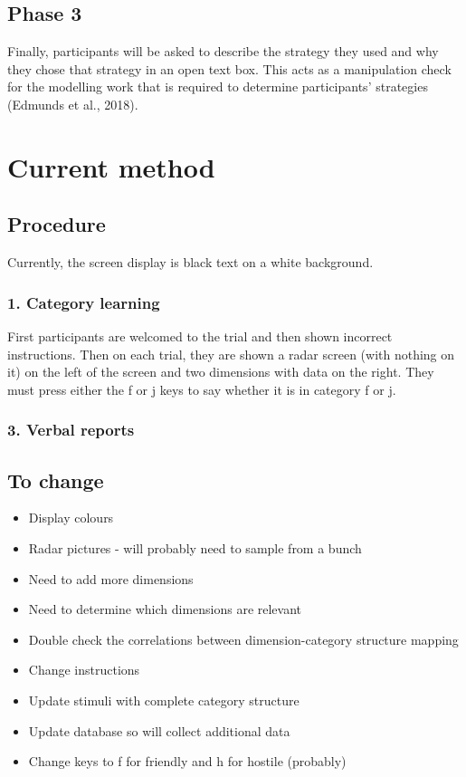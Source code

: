 \documentclass[doc, a4paper, apacite]{apa6}
\begin{document}
\subsection{Phase 3}
Finally, participants will be asked to describe the strategy they used and why they chose that strategy in an open text box. This acts as a manipulation check for the modelling work that is required to determine participants’ strategies (Edmunds et al., 2018). 

\section{Current method}

\subsection{Procedure}
Currently, the screen display is black text on a white background.
\subsubsection{1. Category learning}
First participants are welcomed to the trial and then shown incorrect instructions. 
Then on each trial, they are shown a radar screen (with nothing on it) on the left of the screen and two dimensions with data on the right. 
They must press either the f or j keys to say whether it is in category f or j. 

\subsubsection{3. Verbal reports}

\subsection{To change}
\begin{itemize}
	\item Display colours \\
	\item Radar pictures - will probably need to sample from a bunch \\
	\item Need to add more dimensions \\
	\item Need to determine which dimensions are relevant \\
	\item Double check the correlations between dimension-category structure mapping \\
	\item Change instructions \\
	\item Update stimuli with complete category structure \\
	\item Update database so will collect additional data \\
	\item Change keys to f for friendly and h for hostile (probably) \\
\end{itemize}
\clearpage
\newpage


\end{document}
